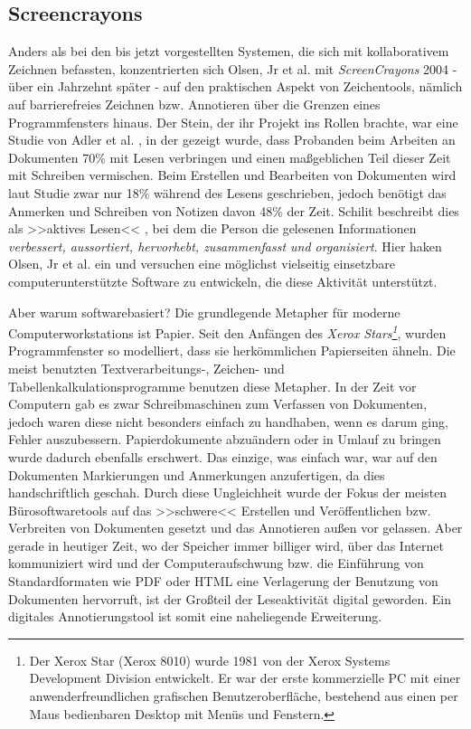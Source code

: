 \subsection{Screencrayons} 
Anders als bei den bis jetzt vorgestellten Systemen, die sich mit kollaborativem Zeichnen befassten, konzentrierten sich Olsen, Jr et al. mit \emph{ScreenCrayons} 2004 - über ein Jahrzehnt später - auf den praktischen Aspekt von Zeichentools, nämlich auf barrierefreies Zeichnen bzw. Annotieren über die Grenzen eines Programmfensters hinaus.
Der Stein, der ihr Projekt ins Rollen brachte, war eine Studie von Adler et al. \citep{Adler:1998}, in der gezeigt wurde, dass Probanden beim Arbeiten an Dokumenten 70\% mit Lesen verbringen und einen maßgeblichen Teil dieser Zeit mit Schreiben vermischen. Beim Erstellen und Bearbeiten von Dokumenten wird laut Studie zwar nur 18\% während des Lesens geschrieben, jedoch benötigt das Anmerken und Schreiben von Notizen davon 48\% der Zeit. Schilit beschreibt dies als >>aktives Lesen<< \citep{Schilit:1998}, bei dem die Person die gelesenen Informationen \emph{verbessert, aussortiert, hervorhebt, zusammenfasst und organisiert}. Hier haken Olsen, Jr et al. \citep{Olsen:2004} ein und versuchen eine möglichst vielseitig einsetzbare computerunterstützte Software zu entwickeln, die diese Aktivität unterstützt.

\medskip Aber warum softwarebasiert? Die grundlegende Metapher für moderne Computerworkstations ist Papier. Seit den Anfängen des \emph{Xerox Stars\footnote{Der Xerox Star (Xerox 8010) wurde 1981 von der Xerox Systems Development Division entwickelt. Er war der erste kommerzielle PC mit einer anwenderfreundlichen grafischen Benutzeroberfläche, bestehend aus einen per Maus bedienbaren Desktop mit Menüs und Fenstern.}}, wurden Programmfenster so modelliert, dass sie herkömmlichen Papierseiten ähneln. Die meist benutzten Textverarbeitungs-, Zeichen- und Tabellenkalkulationsprogramme benutzen diese Metapher. 
In der Zeit vor Computern gab es zwar Schreibmaschinen zum Verfassen von Dokumenten, jedoch waren diese nicht besonders einfach zu handhaben, wenn es darum ging, Fehler auszubessern. Papierdokumente abzuändern oder in Umlauf zu bringen wurde dadurch ebenfalls erschwert. Das einzige, was einfach war, war auf den Dokumenten Markierungen und Anmerkungen anzufertigen, da dies handschriftlich geschah.
Durch diese Ungleichheit wurde der Fokus der meisten Bürosoftwaretools auf das >>schwere<< Erstellen und Veröffentlichen bzw. Verbreiten von Dokumenten gesetzt und das Annotieren außen vor gelassen. Aber gerade in heutiger Zeit, wo der Speicher immer billiger wird, über das Internet kommuniziert wird und der Computeraufschwung bzw. die Einführung von Standardformaten wie \ac{PDF} oder \ac{HTML} eine Verlagerung der Benutzung von Dokumenten hervorruft, ist der Großteil der Leseaktivität digital geworden. Ein digitales Annotierungstool ist somit eine naheliegende Erweiterung.

